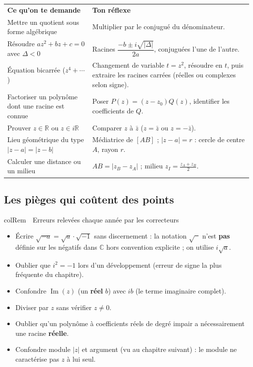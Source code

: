\documentclass[11pt,a4paper]{article}
\newenvironment{remarque}[1][Remarque]
  {\begin{fiche}{colRem}{\ding{43}~~#1}}{\end{fiche}}
\begin{document}
\begin{center}
\renewcommand{\arraystretch}{1.45}
\sffamily\small
\begin{tabular}{>{\raggedright\arraybackslash}p{7.2cm} >{\raggedright\arraybackslash}p{8cm}}
\rowcolor{qtealdark} \color{white}\bfseries Ce qu'on te demande & \color{white}\bfseries Ton réflexe \\
\rowcolor{tealpale} Mettre un quotient sous forme algébrique & Multiplier par le conjugué du dénominateur. \\
Résoudre $az^2+bz+c=0$ avec $\Delta<0$ & Racines $\dfrac{-b\pm i\sqrt{|\Delta|}}{2a}$, conjuguées l'une de l'autre. \\
\rowcolor{tealpale} Équation bicarrée ($z^4+\cdots$) & Changement de variable $t=z^2$, résoudre en $t$, puis extraire les racines carrées (réelles ou complexes selon signe). \\
Factoriser un polynôme dont une racine est connue & Poser $P(z)=(z-z_0)Q(z)$, identifier les coefficients de $Q$. \\
\rowcolor{tealpale} Prouver $z\in\mathbb{R}$ ou $z\in i\mathbb{R}$ & Comparer $z$ à $\bar z$ ($z=\bar z$ ou $z=-\bar z$). \\
Lieu géométrique du type $|z-a|=|z-b|$ & Médiatrice de $[AB]$ ; $|z-a|=r$ : cercle de centre $A$, rayon $r$. \\
\rowcolor{tealpale} Calculer une distance ou un milieu & $AB=|z_B-z_A|$ ; milieu $z_I=\frac{z_A+z_B}{2}$. \\
\end{tabular}
\end{center}

\subsection{Les pièges qui coûtent des points}

\begin{remarque}[Erreurs relevées chaque année par les correcteurs]
\begin{itemize}[leftmargin=6mm, itemsep=0.5mm]
  \item Écrire $\sqrt{-a}=\sqrt a\cdot\sqrt{-1}$ sans discernement : la notation $\sqrt{\phantom{x}}$ n'est \textbf{pas} définie sur les négatifs dans $\mathbb{C}$ hors convention explicite ; on utilise $i\sqrt a$.
  \item Oublier que $i^2=-1$ lors d'un développement (erreur de signe la plus fréquente du chapitre).
  \item Confondre $\operatorname{Im}(z)$ (un \textbf{réel} $b$) avec $ib$ (le terme imaginaire complet).
  \item Diviser par $z$ sans vérifier $z\ne0$.
  \item Oublier qu'un polynôme à coefficients réels de degré impair a nécessairement une racine \textbf{réelle}.
  \item Confondre module $|z|$ et argument (vu au chapitre suivant) : le module ne caractérise pas $z$ à lui seul.
\end{itemize}
\end{remarque}
\end{document}
